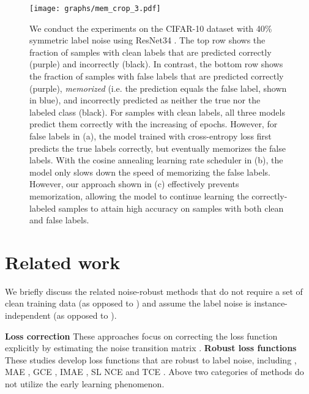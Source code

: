\documentclass{article}
\begin{document}
\begin{figure}[t]
	\begin{center}
		\texttt{[image: graphs/mem\_crop\_3.pdf]}
	\end{center}
	\caption{We conduct the experiments on the CIFAR-10 dataset with 40\% symmetric label noise using ResNet34 \cite{he2016deep}. The top row shows the fraction of samples with clean labels that are predicted correctly (purple) and incorrectly (black). In contrast, the bottom row shows the fraction of samples with false labels that are predicted correctly (purple), \emph{memorized} (i.e. the prediction equals the false label, shown in blue), and incorrectly predicted as neither the true nor the labeled class (black). For samples with clean labels, all three models predict them correctly with the increasing of epochs. However, for false labels in (a), the model trained with cross-entropy loss first predicts the true labels correctly, but eventually memorizes the false labels. With the cosine annealing learning rate scheduler \cite{loshchilov2016sgdr} in (b), the model only slows down the speed of memorizing the false labels. However, our approach shown in (c) effectively prevents memorization, allowing the model to continue learning the correctly-labeled samples to attain high accuracy on samples with both clean and false labels.}
\label{fig:memorization}
	\vspace{-0.5em}
\end{figure}


\section{Related work}
We briefly discuss the related noise-robust methods that do not require a set of clean training data (as opposed to \cite{xiao2015learning,vahdat2017toward,veit2017learning,li2017learning,hendrycks2018using,ren2018learning,lee2018cleannet}) and assume the label noise is instance-independent (as opposed to \cite{cheng2020learning,xia2020parts}). 

\textbf{Loss correction} These approaches focus on correcting the loss function explicitly by estimating the noise transition matrix \cite{goldberger2016training,patrini2017making,tanno2019learning,xia2019anchor}. \textbf{Robust loss functions} These studies develop loss functions that are robust to label noise, including  \cite{xu2019l_dmi}, MAE \cite{ghosh2017robust}, GCE \cite{zhang2018generalized}, IMAE \cite{wang2019imae}, SL \cite{wang2019symmetric} NCE \cite{ma2020normalized} and TCE \cite{feng2020can}. Above two categories of methods do not utilize the early learning phenomenon.  
\end{document}
